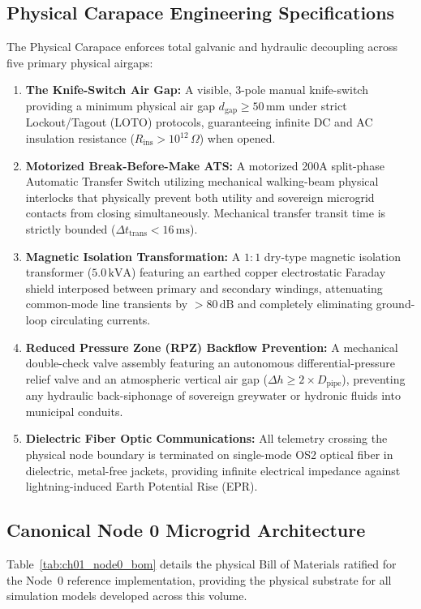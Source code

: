 \subsection{Physical Carapace Engineering Specifications}
The Physical Carapace enforces total galvanic and hydraulic decoupling across five primary physical airgaps:
\begin{enumerate}
    \item \textbf{The Knife-Switch Air Gap:} A visible, 3-pole manual knife-switch providing a minimum physical air gap $d_{\mathrm{gap}} \ge 50\,\mathrm{mm}$ under strict Lockout/Tagout (LOTO) protocols, guaranteeing infinite DC and AC insulation resistance ($R_{\mathrm{ins}} > 10^{12}\,\Omega$) when opened.
    \item \textbf{Motorized Break-Before-Make ATS:} A motorized 200A split-phase Automatic Transfer Switch utilizing mechanical walking-beam physical interlocks that physically prevent both utility and sovereign microgrid contacts from closing simultaneously. Mechanical transfer transit time is strictly bounded ($\Delta t_{\mathrm{trans}} < 16\,\mathrm{ms}$).
    \item \textbf{Magnetic Isolation Transformation:} A $1:1$ dry-type magnetic isolation transformer ($5.0\,\mathrm{kVA}$) featuring an earthed copper electrostatic Faraday shield interposed between primary and secondary windings, attenuating common-mode line transients by $>80\,\mathrm{dB}$ and completely eliminating ground-loop circulating currents.
    \item \textbf{Reduced Pressure Zone (RPZ) Backflow Prevention:} A mechanical double-check valve assembly featuring an autonomous differential-pressure relief valve and an atmospheric vertical air gap ($\Delta h \ge 2 \times D_{\mathrm{pipe}}$), preventing any hydraulic back-siphonage of sovereign greywater or hydronic fluids into municipal conduits.
    \item \textbf{Dielectric Fiber Optic Communications:} All telemetry crossing the physical node boundary is terminated on single-mode OS2 optical fiber in dielectric, metal-free jackets, providing infinite electrical impedance against lightning-induced Earth Potential Rise (EPR).
\end{enumerate}

\subsection{Canonical Node 0 Microgrid Architecture}
Table~\ref{tab:ch01_node0_bom} details the physical Bill of Materials ratified for the Node~0 reference implementation, providing the physical substrate for all simulation models developed across this volume.

